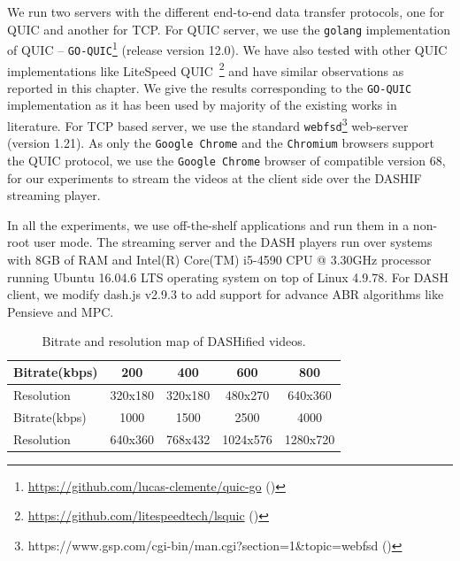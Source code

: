 We run two servers with the different end-to-end data transfer protocols, one for QUIC and another for TCP. For QUIC server, we use the {\tt golang} implementation of QUIC -- \texttt{GO-QUIC}\footnote{\url{https://github.com/lucas-clemente/quic-go} (\lastaccessedtoday)} (release version 12.0). We have also tested with other QUIC implementations like LiteSpeed QUIC~\footnote{\url{https://github.com/litespeedtech/lsquic} (\lastaccessedtoday)} and have similar observations as reported in this chapter. We give the results corresponding to the \texttt{GO-QUIC} implementation as it has been used by majority of the existing works in literature. For TCP based server, we use the standard {\tt webfsd}\footnote{https://www.gsp.com/cgi-bin/man.cgi?section=1\&topic=webfsd (\lastaccessedtoday)} web-server (version 1.21). As only the {\tt Google Chrome} and the {\tt Chromium} browsers support the QUIC protocol, we use the {\tt Google Chrome} browser of compatible version 68, for our experiments to stream the videos at the client side over the DASHIF streaming player.


In all the experiments, we use off-the-shelf applications and run them in a non-root user mode. The streaming server and the DASH players run over systems with 8GB of RAM and Intel(R) Core(TM) i5-4590 CPU @ 3.30GHz processor running Ubuntu 16.04.6 LTS operating system on top of Linux 4.9.78. For DASH client, we modify dash.js v2.9.3 to add support for advance ABR algorithms like Pensieve and MPC.


\begin{table}[h]
     \caption{\label{table:chap03s2:bitrate}Bitrate and resolution map of DASHified videos.}
	\centering
	\begin{tabular}{|l|c|c|c|c|}
		\hline
		Bitrate(kbps) & 200 & 400 & 600 & 800 \\ \hline
		Resolution & 320x180 & 320x180 & 480x270 & 640x360 \\ \hline \hline
		Bitrate(kbps) & 1000 & 1500 & 2500 & 4000 \\ \hline
		Resolution & 640x360 & 768x432 & 1024x576 & 1280x720 \\ \hline
	\end{tabular}
\end{table}

